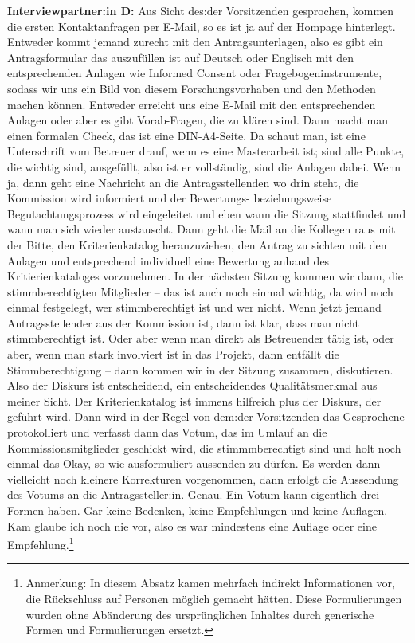 \documentclass[a4paper,12pt,twoside]{scrreprt}
\begin{document}
\textbf{Interviewpartner:in D:} Aus Sicht des:der Vorsitzenden gesprochen, kommen die ersten Kontaktanfragen per E-Mail, so es ist ja auf der Hompage hinterlegt. Entweder kommt jemand zurecht mit den Antragsunterlagen, also es gibt ein Antragsformular das auszufüllen ist auf Deutsch oder Englisch mit den entsprechenden Anlagen wie Informed Consent oder Fragebogeninstrumente, sodass wir uns ein Bild von diesem Forschungsvorhaben und den Methoden machen können. Entweder erreicht uns eine E-Mail mit den entsprechenden Anlagen oder aber es gibt Vorab-Fragen, die zu klären sind. Dann macht man einen formalen Check, das ist eine DIN-A4-Seite. Da schaut man, ist eine Unterschrift vom Betreuer drauf, wenn es eine Masterarbeit ist; sind alle Punkte, die wichtig sind, ausgefüllt, also ist er vollständig, sind die Anlagen dabei. Wenn ja, dann geht eine Nachricht an die Antragsstellenden wo drin steht, die Kommission wird informiert und der Bewertungs- beziehungsweise Begutachtungsprozess wird eingeleitet und eben wann die Sitzung stattfindet und wann man sich wieder austauscht. Dann geht die Mail an die Kollegen raus mit der Bitte, den Kriterienkatalog heranzuziehen, den Antrag zu sichten mit den Anlagen und entsprechend individuell eine Bewertung anhand des Kritierienkataloges vorzunehmen. In der nächsten Sitzung kommen wir dann, die stimmberechtigten Mitglieder -- das ist auch noch einmal wichtig, da wird noch einmal festgelegt, wer stimmberechtigt ist und wer nicht. Wenn jetzt jemand Antragsstellender aus der Kommission ist, dann ist klar, dass man nicht stimmberechtigt ist. Oder aber wenn man direkt als Betreuender tätig ist, oder aber, wenn man stark involviert ist in das Projekt, dann entfällt die Stimmberechtigung -- dann kommen wir in der Sitzung zusammen, diskutieren. Also der Diskurs ist entscheidend, ein entscheidendes Qualitätsmerkmal aus meiner Sicht. Der Kriterienkatalog ist immens hilfreich plus der Diskurs, der geführt wird. Dann wird in der Regel von dem:der Vorsitzenden das Gesprochene protokolliert und verfasst dann das Votum, das im Umlauf an die Kommissionsmitglieder geschickt wird, die stimmmberechtigt sind und holt noch einmal das Okay, so wie ausformuliert aussenden zu dürfen. Es werden dann vielleicht noch kleinere Korrekturen vorgenommen, dann erfolgt die Aussendung des Votums an die Antragssteller:in. Genau. Ein Votum kann eigentlich drei Formen haben. Gar keine Bedenken, keine Empfehlungen und keine Auflagen. Kam glaube ich noch nie vor, also es war mindestens eine Auflage oder eine Empfehlung.\footnote{Anmerkung: In diesem Absatz kamen mehrfach indirekt Informationen vor, die Rückschluss auf Personen möglich gemacht hätten. Diese Formulierungen wurden ohne Abänderung des ursprünglichen Inhaltes durch generische Formen und Formulierungen ersetzt.}
\end{document}
